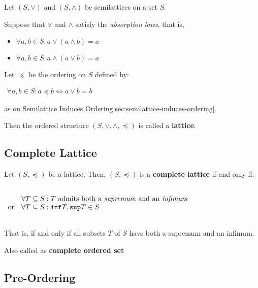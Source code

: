 Let $(S, \vee)$ and $(S, \wedge)$ be semilattices on a set $S$.

Suppose that $\vee$ and $\wedge$ satisfy the \textit{absorption laws}, that is,

\begin{itemize}
\item $\forall a, b \in S: a \vee (a \wedge b) = a$
\item $\forall a, b \in S: a \wedge (a \vee b) = a$
\end{itemize}

Let $\preceq$ be the ordering on $S$ defined by:

\begin{math}
  \begin{array}{c}
    \forall a, b \in S: a \preceq b \iff a \vee b = b
  \end{array}
\end{math}

as on Semilattice Induces
Ordering\ref{sec:semilattice-induces-ordering}.

Then the ordered structure $(S, \vee, \wedge, \preceq)$ is called a
\textbf{lattice}.


\subsection{Complete Lattice}
\label{sec:complete-lattice}

Let $(S, \preceq)$ be a lattice. Then, $(S, \preceq)$ is a
\textbf{complete lattice} if and only if:

\begin{math}
  \begin{array}{ll}
    \\
    & \forall T \subseteq S: T \text{ admits both a \textit{supremum} and an \textit{infimum}} \\
    \text{or} & \forall T \subseteq S: \mathtt{inf}T, \mathtt{sup}T \in S \\
    \\
  \end{array}
\end{math}

That is, if and only if all subsets $T$ of $S$ have both a supremum
and an infimum.

Also called as \textbf{complete ordered set}


\subsection{Pre-Ordering}
\label{sec:pre-ordering}

